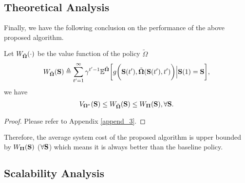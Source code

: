 \subsection{{Theoretical Analysis}}
\label{subsec:analysis}
Finally, we have the following conclusion on the performance of the above proposed algorithm.
\begin{lemma}
    \label{lemma:bound}
    Let $W_{\tilde{\boldsymbol{\Omega}}}(\cdot)$ be the value function of the policy $\tilde{\Omega}$
    \begin{align}
        W_{\tilde{\boldsymbol{\Omega}}}(\mathbf{S}) \triangleq
        \sum_{t'=1}^{\infty} \gamma^{t'-1} \mathbb{E}^{ \tilde{\boldsymbol{\Omega}} } \bigg[
            g\bigg(\mathbf{S}(t'), \tilde{\boldsymbol{\Omega}}(\mathbf{S}(t'),t')\bigg) \Big| \mathbf{S}(1)=\mathbf{S}
        \bigg],
    \end{align}
    we have
    \begin{align}
        V_{\boldsymbol{\Omega}^*}(\mathbf{S})
        \leq W_{\tilde{\boldsymbol{\Omega}}}(\mathbf{S})
        \leq W_{\boldsymbol{\Pi}}(\mathbf{S}),
        \forall \mathbf{S}.
    \end{align}
\end{lemma}
\begin{proof}
    Please refer to Appendix \ref{append_3}.
\end{proof}
Therefore, the average system cost of the proposed algorithm is upper bounded by $W_{\boldsymbol{\Pi}}(\mathbf{S})$ ($\forall \mathbf{S}$) which means it is always better than the baseline policy. 

\subsection{Scalability Analysis}
